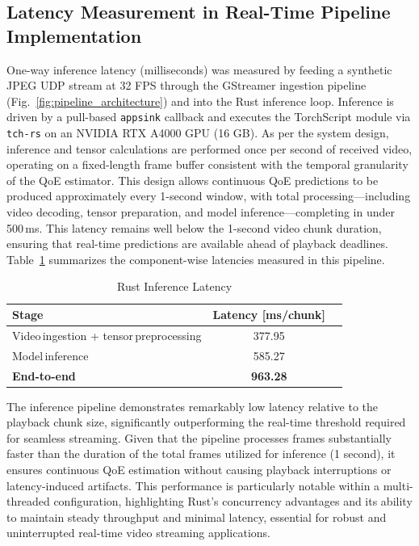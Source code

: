 \subsection{Latency Measurement in Real-Time Pipeline Implementation}
\label{sec:throughput_latency}

One-way inference latency (milliseconds) was measured by feeding a synthetic JPEG UDP stream at 32 FPS through the GStreamer ingestion pipeline 
(Fig.~\ref{fig:pipeline_architecture}) and into the Rust inference loop. Inference is driven by a pull-based \texttt{appsink} callback and executes the 
TorchScript module via \texttt{tch-rs} on an NVIDIA RTX A4000 GPU (16 GB). As per the system design, inference and tensor calculations are performed once 
per second of received video, operating on a fixed-length frame buffer consistent with the temporal granularity of the QoE estimator. This design allows continuous 
QoE predictions to be produced approximately every 1-second window, with total processing—including video decoding, tensor preparation, and model inference—completing 
in under 500\,ms. This latency remains well below the 1-second video chunk duration, ensuring that real-time predictions are available ahead of playback deadlines. 
Table~\ref{tab:throughput_latency} summarizes the component-wise latencies measured in this pipeline.


\begin{table}[h]
  \centering
  \caption{Rust Inference Latency}
  \label{tab:throughput_latency}
  \begin{tabular}{lcc}
    \toprule
    Stage                 & Latency [ms/chunk] \\
    \midrule
    Video\,ingestion + tensor\,preprocessing & 377.95 \\
    Model\,inference            & 585.27 \\
    \textbf{End-to-end}         & \textbf{963.28} \\
    \bottomrule
  \end{tabular}
\end{table}

The inference pipeline demonstrates remarkably low latency relative to the playback chunk size, significantly outperforming the real-time 
threshold required for seamless streaming. Given that the pipeline processes frames substantially faster than the duration of the total frames 
utilized for inference (1 second), it ensures continuous QoE estimation without causing playback interruptions or latency-induced artifacts. 
This performance is particularly notable within a multi-threaded configuration, highlighting Rust's concurrency advantages and its ability to 
maintain steady throughput and minimal latency, essential for robust and uninterrupted real-time video streaming applications.

